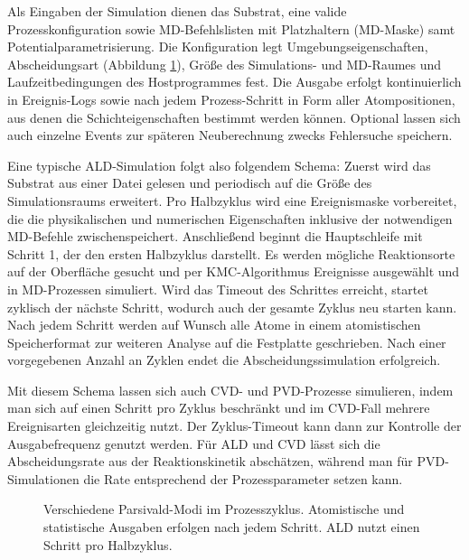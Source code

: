 Als Eingaben der Simulation dienen das Substrat, eine valide Prozesskonfiguration sowie MD-Befehlslisten mit Platzhaltern (MD-Maske) samt Potentialparametrisierung.
Die Konfiguration legt Umgebungseigenschaften, Abscheidungsart (Abbildung \ref{fig:parsivald-modes}), Größe des Simulations- und MD-Raumes und Laufzeitbedingungen des Hostprogrammes fest.
Die Ausgabe erfolgt kontinuierlich in Ereignis-Logs sowie nach jedem Prozess-Schritt in Form aller Atompositionen, aus denen die Schichteigenschaften bestimmt werden können.
Optional lassen sich auch einzelne Events zur späteren Neuberechnung zwecks Fehlersuche speichern.

Eine typische ALD-Simulation folgt also folgendem Schema:
Zuerst wird das Substrat aus einer Datei gelesen und periodisch auf die Größe des Simulationsraums erweitert.
Pro Halbzyklus wird eine Ereignismaske vorbereitet, die die physikalischen und numerischen Eigenschaften inklusive der notwendigen MD-Befehle zwischenspeichert.
Anschließend beginnt die Hauptschleife mit Schritt 1, der den ersten Halbzyklus darstellt.
Es werden mögliche Reaktionsorte auf der Oberfläche gesucht und per KMC-Algorithmus Ereignisse ausgewählt und in MD-Prozessen simuliert.
Wird das Timeout des Schrittes erreicht, startet zyklisch der nächste Schritt, wodurch auch der gesamte Zyklus neu starten kann.
Nach jedem Schritt werden auf Wunsch alle Atome in einem atomistischen Speicherformat zur weiteren Analyse auf die Festplatte geschrieben.
Nach einer vorgegebenen Anzahl an Zyklen endet die Abscheidungssimulation erfolgreich.

Mit diesem Schema lassen sich auch CVD- und PVD-Prozesse simulieren, indem man sich auf einen Schritt pro Zyklus beschränkt und im CVD-Fall mehrere Ereignisarten gleichzeitig nutzt.
Der Zyklus-Timeout kann dann zur Kontrolle der Ausgabefrequenz genutzt werden.
Für ALD und CVD lässt sich die Abscheidungsrate aus der Reaktionskinetik abschätzen, während man für PVD-Simulationen die Rate entsprechend der Prozessparameter setzen kann.

\begin{figure}
  \captionsetup[subfigure]{singlelinecheck=false}
  \begin{subfigure}[t]{5.7cm}
    \def\svgwidth{\textwidth}
    
  \end{subfigure}
  \hfill
  \begin{subfigure}[t]{4.7cm}
    \def\svgwidth{\textwidth}
    
  \end{subfigure}
  \hfill
  \begin{subfigure}[t]{3cm}
    \def\svgwidth{\textwidth}
    
  \end{subfigure}
  \caption[Parsivald-Modi]{
    Verschiedene Parsivald-Modi im Prozesszyklus.
    Atomistische und statistische Ausgaben erfolgen nach jedem Schritt.
    ALD nutzt einen Schritt pro Halbzyklus.
  }
  \label{fig:parsivald-modes}
\end{figure}

